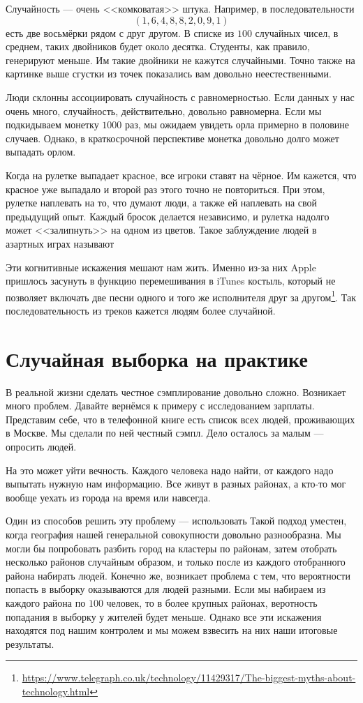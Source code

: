 \documentclass[12pt, a4paper, oneside]{article}
\begin{document}
Случайность --- очень <<комковатая>> штука. Например, в последовательности $$(1, 6, 4, 8, 8, 2, 0, 9, 1)$$ есть две восьмёрки рядом с друг другом. В списке из $100$ случайных чисел, в среднем, таких двойников будет около десятка. Студенты, как правило, генерируют меньше. Им такие двойники не кажутся случайными. Точно также на картинке выше сгустки из точек показались вам довольно неестественными. 

Люди склонны ассоциировать случайность с равномерностью. Если данных у нас очень много, случайность, действительно, довольно равномерна. Если мы подкидываем монетку $1000$ раз, мы ожидаем увидеть орла примерно в половине случаев.  Однако, в краткосрочной перспективе монетка довольно долго может выпадать орлом. 

Когда на рулетке выпадает красное, все игроки ставят на чёрное. Им кажется, что красное уже выпадало и второй раз этого точно не повториться. При этом, рулетке наплевать на то, что думают люди, а также ей наплевать на свой предыдущий опыт. Каждый бросок делается независимо, и рулетка надолго может <<залипнуть>> на одном из цветов. Такое заблуждение людей в азартных играх называют 

Эти когнитивные искажения мешают нам жить. Именно из-за них Apple пришлось засунуть в функцию перемешивания в iTunes костыль, который не позволяет включать две песни одного и того же исполнителя друг за другом\footnote{\url{https://www.telegraph.co.uk/technology/11429317/The-biggest-myths-about-technology.html}}. Так последовательность из треков кажется людям более случайной.  


\section{Случайная выборка на практике} 

В реальной жизни сделать честное сэмплирование довольно сложно. Возникает много проблем. Давайте вернёмся к примеру с исследованием зарплаты. Представим себе, что в телефонной книге есть список всех людей, проживающих в Москве. Мы сделали по ней честный сэмпл. Дело осталось за малым --- опросить людей. 

На это может уйти вечность. Каждого человека надо найти, от каждого надо выпытать нужную нам информацию. Все живут в разных районах, а кто-то мог вообще уехать из города на время или навсегда. 

Один из способов решить эту проблему --- использовать  Такой подход уместен, когда география нашей генеральной совокупности довольно разнообразна. Мы могли бы попробовать разбить город на кластеры по районам, затем отобрать несколько районов случайным образом, и только после из каждого отобранного района набирать людей. Конечно же, возникает проблема с тем, что вероятности попасть в выборку оказываются для людей разными. Если мы набираем из каждого района по $100$ человек, то в более крупных районах, веротность попадания в выборку у жителей будет меньше. Однако все эти искажения находятся под нашим контролем и мы можем взвесить на них наши итоговые результаты. 
\end{document}

